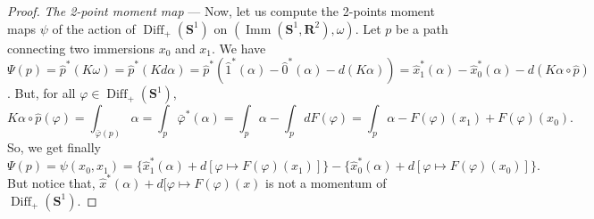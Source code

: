 \documentclass[10pt,reqno,twoside]{amsart}
\DeclareMathOperator{\Diff}{Diff}
\DeclareMathOperator{\Imm}{Imm}
\theoremstyle{plain}
\theoremstyle{definition}
\begin{document}
\begin{proof}
    \emph{The 2-point moment map} --- Now,
    let us compute the 2-points moment maps $\psi$ of the action of $\Diff_+(\mathbf{S}^1)$ on $(\Imm(\mathbf{S}^1,\mathbf{R}^2),\omega)$.
    Let $p$ be a path connecting two immersions $x_0$ and $x_1$.
    We have $\Psi(p) = \hat{p}^*(K\omega) = \hat{p}^*(K d\alpha) = \hat{p}^*(\hat{1}^*(\alpha) - \hat{0}^*(\alpha) - d(K\alpha)) = \hat{x}_1^*(\alpha) - \hat{x}_0^*(\alpha) - d(K\alpha \circ \hat{p})$.
    But,
    for all $\varphi \in \Diff_+(\mathbf{S}^1)$,
    \[
    K\alpha \circ \hat{p}(\varphi) = \int_{\bar{\varphi} (p)} \alpha = \int_p \bar{\varphi}^*(\alpha) = \int_p\alpha - \int_p dF(\varphi) = \int_p\alpha - F(\varphi)(x_1) + F(\varphi)(x_0).
    \]
    So,
    we get finally
    \[
    \Psi(p) = \psi(x_0,x_1) = \{\hat{x}_1^*(\alpha) + d[\varphi \mapsto F(\varphi)(x_1)]\} - \{\hat{x}_0^*(\alpha) + d[\varphi \mapsto F(\varphi)(x_0)]\}.
    \]
    But notice that,
    $\hat{x}^*(\alpha) + d[\varphi \mapsto F(\varphi)(x)$ is not a momentum of $\Diff_+(\mathbf{S}^1)$.
    

\end{proof}
\end{document}
